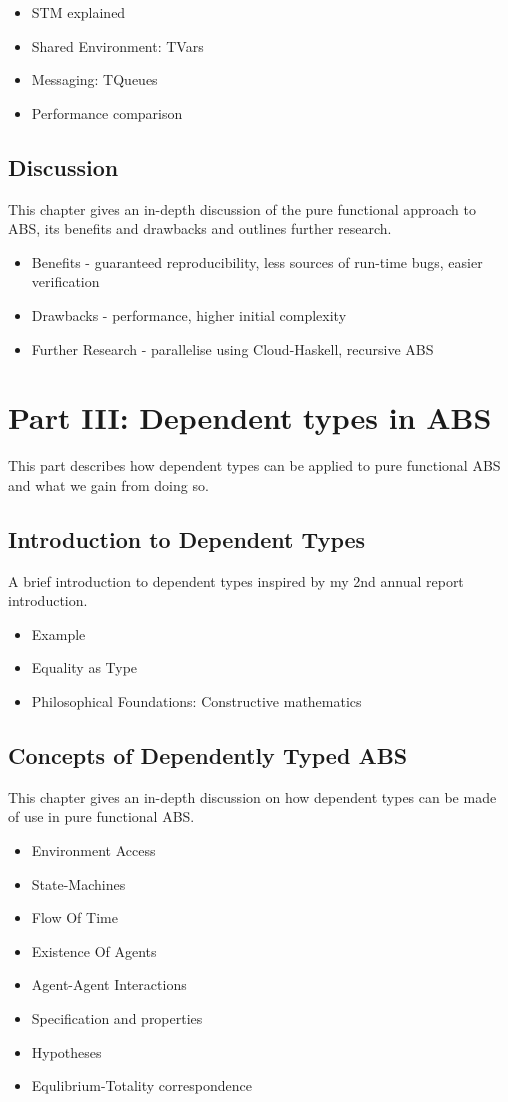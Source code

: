 \begin{itemize}
	\item STM explained
	\item Shared Environment: TVars
	\item Messaging: TQueues
	\item Performance comparison
\end{itemize}

\subsection{Discussion}
This chapter gives an in-depth discussion of the pure functional approach to ABS, its benefits and drawbacks and outlines further research.
\begin{itemize}
	\item Benefits - guaranteed reproducibility, less sources of run-time bugs, easier verification
	\item Drawbacks - performance, higher initial complexity
	\item Further Research - parallelise using Cloud-Haskell, recursive ABS
\end{itemize}

\section{Part III: Dependent types in ABS}
This part describes how dependent types can be applied to pure functional ABS and what we gain from doing so.

\subsection{Introduction to Dependent Types}
A brief introduction to dependent types inspired by my 2nd annual report introduction.
\begin{itemize}
	\item Example
	\item Equality as Type
	\item Philosophical Foundations: Constructive mathematics
\end{itemize}

\subsection{Concepts of Dependently Typed ABS}
This chapter gives an in-depth discussion on how dependent types can be made of use in pure functional ABS.
\begin{itemize}
	\item Environment Access
	\item State-Machines
	\item Flow Of Time
	\item Existence Of Agents
	\item Agent-Agent Interactions
	\item Specification and properties
	\item Hypotheses
	\item Equlibrium-Totality correspondence
\end{itemize}

